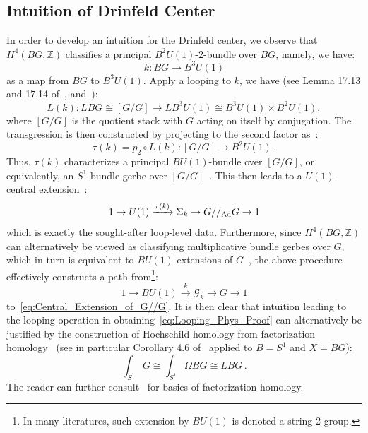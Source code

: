 \documentclass[a4paper,11pt]{article}
\begin{document}
\subsection{Intuition of Drinfeld Center}\label{sec:intuitioncenter}
In order to develop an intuition for the Drinfeld center, we observe that $H^4(BG,\mathbb Z)$ classifies a principal $B^2U(1)$-2-bundle over $BG$, namely, we have:
\begin{equation}\label{eq:Point_Level_Phys_Proof}
    k: BG \rightarrow B^3U(1)
\end{equation}
as a map from $BG$ to $B^3U(1)$. Apply a looping to $k$, we have (see Lemma 17.13 and 17.14 of~\cite{Behrend:2011ui}, and~\cite{Bunke:2006ipq}):
\begin{equation}\label{eq:Looping_Phys_Proof}
    L(k) : LBG \cong [G/G] \rightarrow LB^3U(1) \cong B^3U(1)\times B^2U(1),
\end{equation}
where $[G/G]$ is the quotient stack with $G$ acting on itself by conjugation.
The transgression is then constructed by projecting to the second factor as~\cite{fiorenza2015higher}:
\begin{equation}\label{eq:Loop_Level_Phys_Proof}
    \tau(k) = p_2\circ L(k): [G/G] \rightarrow B^2U(1)\,.
\end{equation}
Thus, $\tau(k)$ characterizes a principal $BU(1)$-bundle over $[G/G]$, or equivalently, an $S^1$-bundle-gerbe over $[G/G]$~\cite{Nikolaus:2011ag}. This then leads to a $U(1)$-central extension~\cite{behrend2003equivariant, Behrend:2008}:
\begin{equation}\label{eq:Central_Extension_of_G//G}
    1 \rightarrow U(1) \xrightarrow{\tau(k)} \Sigma_k \rightarrow G//_{\rm Ad} G \rightarrow 1
\end{equation}
which is exactly the sought-after loop-level data. Furthermore, since $H^4(BG, \mathbb{Z})$ can alternatively be viewed as classifying multiplicative bundle gerbes over $G$, which in turn is equivalent to $BU(1)$-extensions of $G$~\cite{waldorf2012construction}, the above procedure effectively constructs a path from\footnote{In many literatures, such extension by $BU(1)$ is denoted a string 2-group.}:
\begin{equation}\label{eq:Central_Extension_of_G}
    1 \rightarrow BU(1) \xrightarrow{k} \mathcal G_k \rightarrow G \rightarrow 1
\end{equation}
to~\eqref{eq:Central_Extension_of_G//G}. It is then clear that intuition leading to the looping operation in obtaining~\eqref{eq:Looping_Phys_Proof} can alternatively be justified by the construction of Hochschild homology from factorization homology~\cite{Ben-Zvi:2008vtm, ben2012morita, haine2019nonabelian} (see in particular Corollary 4.6 of~\cite{ayala2015factorization} applied to $B = S^1$ and $X = BG$):
\begin{equation}
    \int_{S^1} G \cong \int_{S^1} \Omega BG \cong LBG\,.
\end{equation}
The reader can further consult~\cite{Amabel:2019yrn, Costello:2021jvx} for basics of factorization homology.
\end{document}
